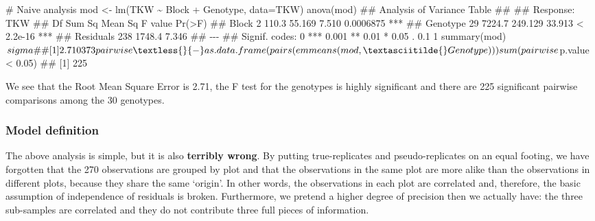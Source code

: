 \documentclass[a4paper,12pt,oneside]{book}
\newenvironment{Shaded}{\begin{snugshade}}{\end{snugshade}}
\newcommand{\FloatTok}[1]{#1}
\newcommand{\SpecialCharTok}[1]{#1}
\newcommand{\CommentTok}[1]{#1}
\newcommand{\DocumentationTok}[1]{#1}
\newcommand{\OtherTok}[1]{#1}
\newcommand{\FunctionTok}[1]{#1}
\newcommand{\AttributeTok}[1]{#1}
\newcommand{\NormalTok}[1]{#1}
\begin{document}
\begin{Shaded}
\begin{Highlighting}[]
\CommentTok{\# Naive analysis}
\NormalTok{mod }\OtherTok{\textless{}{-}} \FunctionTok{lm}\NormalTok{(TKW }\SpecialCharTok{\textasciitilde{}}\NormalTok{ Block }\SpecialCharTok{+}\NormalTok{ Genotype, }\AttributeTok{data=}\NormalTok{TKW)}
\FunctionTok{anova}\NormalTok{(mod)}
\DocumentationTok{\#\# Analysis of Variance Table}
\DocumentationTok{\#\# }
\DocumentationTok{\#\# Response: TKW}
\DocumentationTok{\#\#            Df Sum Sq Mean Sq F value    Pr(\textgreater{}F)    }
\DocumentationTok{\#\# Block       2  110.3  55.169   7.510 0.0006875 ***}
\DocumentationTok{\#\# Genotype   29 7224.7 249.129  33.913 \textless{} 2.2e{-}16 ***}
\DocumentationTok{\#\# Residuals 238 1748.4   7.346                      }
\DocumentationTok{\#\# {-}{-}{-}}
\DocumentationTok{\#\# Signif. codes:  0 \textquotesingle{}***\textquotesingle{} 0.001 \textquotesingle{}**\textquotesingle{} 0.01 \textquotesingle{}*\textquotesingle{} 0.05 \textquotesingle{}.\textquotesingle{} 0.1 \textquotesingle{} \textquotesingle{} 1}
\FunctionTok{summary}\NormalTok{(mod)}\SpecialCharTok{$}\NormalTok{sigma}
\DocumentationTok{\#\# [1] 2.710373}
\NormalTok{pairwise }\OtherTok{\textless{}{-}} \FunctionTok{as.data.frame}\NormalTok{(}\FunctionTok{pairs}\NormalTok{(}\FunctionTok{emmeans}\NormalTok{(mod, }\SpecialCharTok{\textasciitilde{}}\NormalTok{Genotype)))}
\FunctionTok{sum}\NormalTok{(pairwise}\SpecialCharTok{$}\NormalTok{p.value }\SpecialCharTok{\textless{}} \FloatTok{0.05}\NormalTok{)}
\DocumentationTok{\#\# [1] 225}
\end{Highlighting}
\end{Shaded}

We see that the Root Mean Square Error is 2.71, the F test for the genotypes is highly significant and there are 225 significant pairwise comparisons among the 30 genotypes.

\hypertarget{model-definition-6}{%
\subsubsection{Model definition}\label{model-definition-6}}

The above analysis is simple, but it is also \textbf{terribly wrong}. By putting true-replicates and pseudo-replicates on an equal footing, we have forgotten that the 270 observations are grouped by plot and that the observations in the same plot are more alike than the observations in different plots, because they share the same `origin'. In other words, the observations in each plot are correlated and, therefore, the basic assumption of independence of residuals is broken. Furthermore, we pretend a higher degree of precision then we actually have: the three sub-samples are correlated and they do not contribute three full pieces of information.
\end{document}
